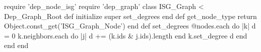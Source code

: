 \begin{rubyblock}
require 'dep_node_isg'
require 'dep_graph'
class ISG_Graph < Dep_Graph_Root
  def initialize
    super
    set_degrees
  end
  def get_node_type
    return Object.const_get('ISG_Graph_Node')
  end
  def set_degrees
    @nodes.each do |k|
      d = 0
      k.neighbors.each do |j|
        d += (k.ids & j.ids).length
      end
      k.set_degree d
    end
  end
end
\end{rubyblock}
